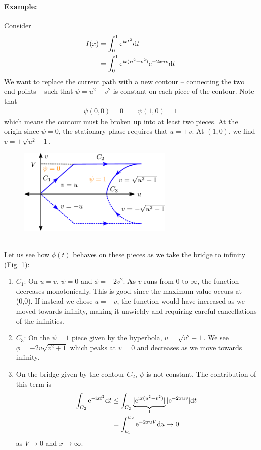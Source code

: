 \paragraph{Example:} Consider 
\begin{align*}
	I(x) &= \int_{0}^{1} \mathrm{e}^{\mathrm{i} x t^2} \mathrm{d} t \\
	&= \int_{0}^{1} \mathrm{e}^{\mathrm{i} x (u^2-v^2)}\mathrm{e}^{- 2x u v} \mathrm{d} t
\end{align*}
We want to replace the current path with a new contour -- connecting the two end points -- such that $\psi = u^2-v^2$ is constant on each piece of the contour. Note that 
\begin{gather*}
	\psi(0,0) = 0 \qquad \psi(1,0) = 1
\end{gather*}
which means the contour must be broken up into at least two pieces. At the origin since $\psi = 0$, the stationary phase requires that $u=\pm v$. At $(1,0)$, we find $v = \pm \sqrt{u^2-1}$. 
\begin{figure}[h]
	\centering
	\includegraphics[width=0.66\textwidth]{./plots/pdf/steepestdescent.pdf}
	\caption{}
	\label{fig:strogatz-wk06}
\end{figure}\\
Let us see how $\phi(t)$ behaves on these pieces as we take the bridge to infinity (Fig. \ref{fig:strogatz-wk06}): 
\begin{enumerate}
	\item $C_1$: On $u=v$, $\psi=0$ and $\phi = -2v^2$. As $v$ runs from $0$ to $\infty$, the function decreases monotonically. This is good since the maximum value occurs at (0,0). If instead we chose $u=-v$, the function would have increased as we moved towards infinity, making it unwieldy and requiring careful cancellations of the infinities.
	\item $C_3$: On the $\psi = 1$ piece given by the hyperbola, $u = \sqrt{v^2+1}$. We see $\phi = -2v\sqrt{v^2+1}$ which peaks at $v=0$ and decreases as we move towards infinity. 
	\item On the bridge given by the contour $C_2$, $\psi$ is not constant. The contribution of this term is
	\begin{align*}
		\int_{C_2} \mathrm{e}^{-\mathrm{i} x t^2} \mathrm{d} t &\leq \int_{C_2} \underbrace{| \mathrm{e}^{\mathrm{i} x (u^2 - v^2)}|}_1|\mathrm{e}^{-2xuv}| \mathrm{d} t  \\
		& = \int_{u_1}^{u_2} \mathrm{e}^{-2xuV} \mathrm{d} u \rightarrow 0
	\end{align*}
	as $V \rightarrow 0$ and $x \rightarrow \infty $.
\end{enumerate}
